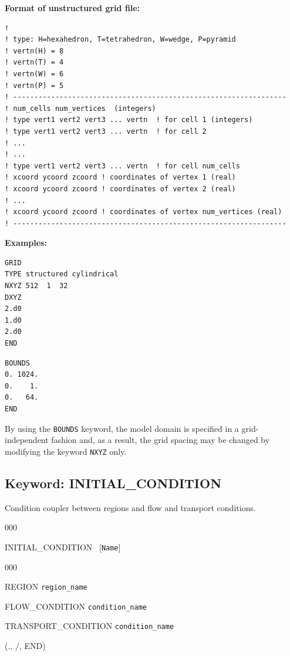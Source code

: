 \documentclass[12pt]{article}
\begin{document}
\noindent
{\bf Format of unstructured grid file:}
\begin{verbatim}
! 
! type: H=hexahedron, T=tetrahedron, W=wedge, P=pyramid
! vertn(H) = 8
! vertn(T) = 4
! vertn(W) = 6
! vertn(P) = 5
! -----------------------------------------------------------------
! num_cells num_vertices  (integers)
! type vert1 vert2 vert3 ... vertn  ! for cell 1 (integers)
! type vert1 vert2 vert3 ... vertn  ! for cell 2
! ...
! ...
! type vert1 vert2 vert3 ... vertn  ! for cell num_cells
! xcoord ycoord zcoord ! coordinates of vertex 1 (real)
! xcoord ycoord zcoord ! coordinates of vertex 2 (real)
! ...
! xcoord ycoord zcoord ! coordinates of vertex num_vertices (real)
! -----------------------------------------------------------------
\end{verbatim}
\noindent
{\bf Examples:}
\begin{verbatim}
GRID
TYPE structured cylindrical
NXYZ 512  1  32
DXYZ
2.d0
1.d0
2.d0
END
\end{verbatim}

\begin{verbatim}
BOUNDS
0. 1024.
0.    1.
0.   64.
END
\end{verbatim}

\noindent
By using the {\tt BOUNDS} keyword, the model domain is specified in a grid-independent fashion and, as a result, the grid spacing may be changed by modifying the keyword {\tt NXYZ} only.


\newpage
\protect\hypertarget{target_init}{}

\subsection{Keyword: INITIAL\_CONDITION}

 Condition coupler between regions and flow and transport conditions.

\begin{deflist}{000}
\item[INITIAL\_CONDITION] \ [{\tt Name}]
\begin{deflist}{000}
\item[REGION] {\tt region\_name}
\item[FLOW\_CONDITION] {\tt condition\_name}
\item[TRANSPORT\_CONDITION] {\tt condition\_name}
\end{deflist}
\item[(., /, END)] ~
\end{deflist}
\end{document}
